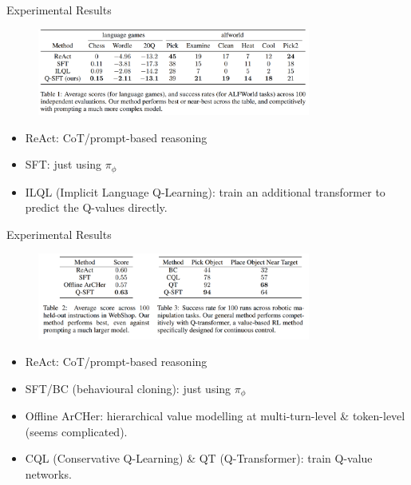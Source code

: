 \documentclass[aspectratio=169]{beamer}
\begin{document}
\begin{frame}{Experimental Results}
    \begin{figure}
        \includegraphics[width=0.8\textwidth]{img/Q-SFT eval1.png}
    \end{figure}
    \begin{itemize}
        \item ReAct: CoT/prompt-based reasoning
        \item SFT: just using $\pi_\phi$
        \item ILQL (Implicit Language Q-Learning): train an additional transformer to predict the Q-values directly.
    \end{itemize}
\end{frame}


\begin{frame}{Experimental Results}
    \begin{figure}
        \includegraphics[width=0.8\textwidth]{img/Q-SFT eval2.png}
    \end{figure}
    \begin{itemize}
        \item ReAct: CoT/prompt-based reasoning
        \item SFT/BC (behavioural cloning): just using $\pi_\phi$
        \item Offline ArCHer: hierarchical value modelling at multi-turn-level \& token-level (seems complicated).
        \item CQL (Conservative Q-Learning) \& QT (Q-Transformer): train Q-value networks.
    \end{itemize}
\end{frame}
\end{document}
